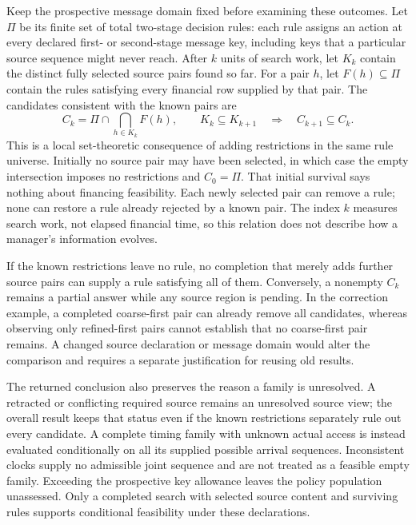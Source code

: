Keep the prospective message domain fixed before examining these outcomes. Let $\Pi$ be its finite set of total two-stage decision rules: each rule assigns an action at every declared first- or second-stage message key, including keys that a particular source sequence might never reach. After $k$ units of search work, let $K_k$ contain the distinct fully selected source pairs found so far. For a pair $h$, let $F(h)\subseteq\Pi$ contain the rules satisfying every financial row supplied by that pair. The candidates consistent with the known pairs are
\begin{equation}
 C_k=\Pi\cap\bigcap_{h\in K_k} F(h),
 \qquad K_k\subseteq K_{k+1}
 \quad\Longrightarrow\quad C_{k+1}\subseteq C_k.
 \label{eq:joint-partial-policy-monotonicity}
\end{equation}
This is a local set-theoretic consequence of adding restrictions in the same rule universe. Initially no source pair may have been selected, in which case the empty intersection imposes no restrictions and $C_0=\Pi$. That initial survival says nothing about financing feasibility. Each newly selected pair can remove a rule; none can restore a rule already rejected by a known pair. The index $k$ measures search work, not elapsed financial time, so this relation does not describe how a manager's information evolves.

If the known restrictions leave no rule, no completion that merely adds further source pairs can supply a rule satisfying all of them. Conversely, a nonempty $C_k$ remains a partial answer while any source region is pending. In the correction example, a completed coarse-first pair can already remove all candidates, whereas observing only refined-first pairs cannot establish that no coarse-first pair remains. A changed source declaration or message domain would alter the comparison and requires a separate justification for reusing old results.

The returned conclusion also preserves the reason a family is unresolved. A retracted or conflicting required source remains an unresolved source view; the overall result keeps that status even if the known restrictions separately rule out every candidate. A complete timing family with unknown actual access is instead evaluated conditionally on all its supplied possible arrival sequences. Inconsistent clocks supply no admissible joint sequence and are not treated as a feasible empty family. Exceeding the prospective key allowance leaves the policy population unassessed. Only a completed search with selected source content and surviving rules supports conditional feasibility under these declarations.

